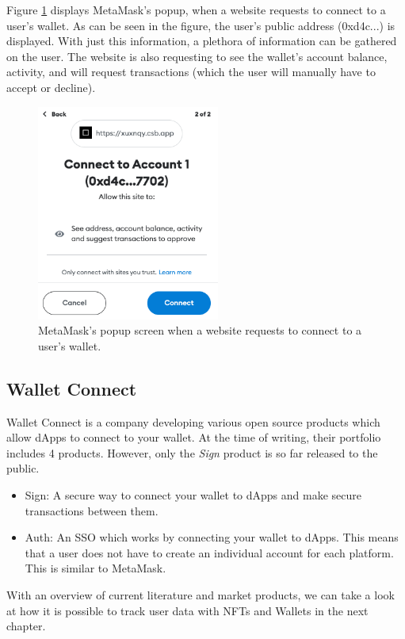 Figure \ref{fig:metamaskPopup} displays MetaMask's popup, when a website requests to connect to a user's wallet. As can be seen in the figure, the user's public address (0xd4c...) is displayed. With just this information, a plethora of information can be gathered on the user. The website is also requesting to see the wallet's account balance, activity, and will request transactions (which the user will manually have to accept or decline).

\begin{figure}[t]
\includegraphics[width=6cm]{./gfx/metamaskPopup.png}
\centering
\caption{MetaMask's popup screen when a website requests to connect to a user's wallet.}
\label{fig:metamaskPopup}
\end{figure}


\subsection{Wallet Connect}
\label{sec:sota:walletConnect}
Wallet Connect \cite{walletConnect} is a company developing various open source products which allow dApps to connect to your wallet. At the time of writing, their portfolio includes 4 products. However, only the \textit{Sign} product is so far released to the public.

\begin{itemize}
	\item Sign: A secure way to connect your wallet to dApps and make secure transactions between them. \cite{walletConnect}
	\item Auth: An SSO which works by connecting your wallet to dApps. This means that a user does not have to create an individual account for each platform. This is similar to MetaMask. \cite{walletConnect}
\end{itemize}

With an overview of current literature and market products, we can take a look at how it is possible to track user data with NFTs and Wallets in the next chapter.